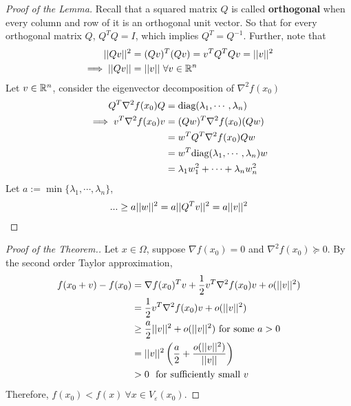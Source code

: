 \documentclass{article}
\begin{document}
   	\begin{proof}[Proof of the Lemma]
   		Recall that a squared matrix $Q$ is called \textbf{orthogonal} when every column and row of it is an orthogonal unit vector. So that for every orthogonal matrix $Q$, $Q^T Q = I$, which implies $Q^T = Q^{-1}$. Further, note that 
   		\begin{align}
   			\vert \vert {Qv} \vert \vert^2 &= (Qv)^T (Qv)
   			= v^T Q^T Q v 
   			= \vert \vert {v} \vert \vert^2 \\
   			\implies \vert \vert {Qv} \vert \vert &= \vert \vert {v} \vert \vert\ \forall v \in \mathbb{R}^n
   		\end{align}
   		Let $v \in \mathbb{R}^n$, consider the eigenvector decomposition of $\nabla^2 f(x_0)$
   		\begin{align}
   			Q^T \nabla^2 f(x_0) Q &= \text{{diag}}(\lambda_1, \cdots, \lambda_n) \\
   			\implies v^T \nabla^2 f(x_0) v &= (Qw)^T \nabla^2 f(x_0) (Qw) \\
   			&= w^T Q^T \nabla^2 f(x_0) Q w \\
   			&= w^T \text{{diag}}(\lambda_1, \cdots, \lambda_n) w \\
   			&= \lambda_1 w_1^2 + \cdots + \lambda_n w_n^2
   		\end{align}
   		Let $a := \min\{\lambda_1, \cdots, \lambda_n\}$,
   		\begin{align}
   			... \geq a \vert \vert {w} \vert \vert^2 = a\vert \vert {Q^T v} \vert \vert^2 = a \vert \vert {v} \vert \vert^2
   		\end{align}
   	\end{proof}
   	
   	\begin{proof}[Proof of the Theorem.]
   		Let $x \in \Omega$, suppose $\nabla f(x_0) = 0$ and $\nabla^2 f(x_0) \succcurlyeq 0$. By the second order Taylor approximation,
   		\begin{align}
   			f(x_0 + v) - f(x_0) &= \nabla f(x_0)^T v + \frac{1}{2} v^T \nabla^2 f(x_0) v + o(\vert \vert {v} \vert \vert^2) \\
   			&= \frac{1}{2} v^T \nabla^2 f(x_0) v + o(\vert \vert {v} \vert \vert^2) \\
   			&\geq \frac{a}{2} \vert \vert {v} \vert \vert^2 + o(\vert \vert {v} \vert \vert^2) \text{{ for some }}a > 0 \\
   			&= \vert \vert {v} \vert \vert^2 \left (
   			\frac{a}{2} + \frac{o(\vert \vert {v} \vert \vert^2)}{\vert \vert {v} \vert \vert} \right) \\
   			&>0\ \text{{ for sufficiently small }} v
   		\end{align}
   		Therefore, $f(x_0) < f(x)\ \forall x \in V_\varepsilon(x_0)$.
   	\end{proof}
   	
\end{document}
